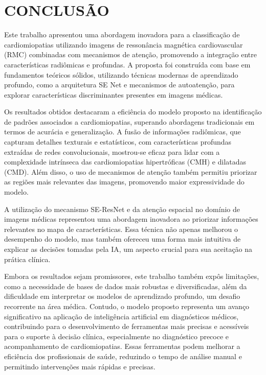 \chapter{CONCLUSÃO}
\label{chap:cap7_conclusao}

Este trabalho apresentou uma abordagem inovadora para a classificação de cardiomiopatias utilizando imagens de ressonância magnética cardiovascular (RMC) combinadas com mecanismos de atenção, promovendo a integração entre características radiômicas e profundas. A proposta foi construída com base em fundamentos teóricos sólidos, utilizando técnicas modernas de aprendizado profundo, como a arquitetura \gls{SE} Net e mecanismos de autoatenção, para explorar características discriminantes presentes em imagens médicas.

Os resultados obtidos destacaram a eficiência do modelo proposto na identificação de padrões associados a cardiomiopatias, superando abordagens tradicionais em termos de acurácia e generalização. A fusão de informações radiômicas, que capturam detalhes texturais e estatísticos, com características profundas extraídas de redes convolucionais, mostrou-se eficaz para lidar com a complexidade intrínseca das cardiomiopatias hipertróficas (CMH) e dilatadas (CMD). Além disso, o uso de mecanismos de atenção também permitiu priorizar as regiões mais relevantes das imagens, promovendo maior expressividade do modelo.

A utilização do mecanismo SE-ResNet e da atenção espacial no domínio de imagens médicas representou uma abordagem inovadora ao priorizar informações relevantes no mapa de características. Essa técnica não apenas melhorou o desempenho do modelo, mas também ofereceu uma forma mais intuitiva de explicar as decisões tomadas pela IA, um aspecto crucial para sua aceitação na prática clínica.

Embora os resultados sejam promissores, este trabalho também expôs limitações, como a necessidade de bases de dados mais robustas e diversificadas, além da dificuldade em interpretar os modelos de aprendizado profundo, um desafio recorrente na área médica. Contudo, o modelo proposto representa um avanço significativo na aplicação de inteligência artificial em diagnósticos médicos, contribuindo para o desenvolvimento de ferramentas mais precisas e acessíveis para o suporte à decisão clínica, especialmente no diagnóstico precoce e acompanhamento de cardiomiopatias. Essas ferramentas podem melhorar a eficiência dos profissionais de saúde, reduzindo o tempo de análise manual e permitindo intervenções mais rápidas e precisas.

